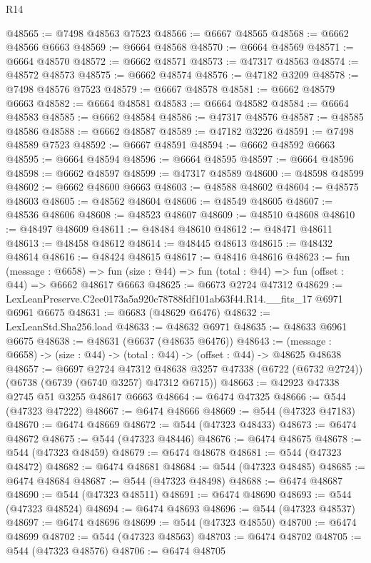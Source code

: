 \begin{lexlean}{R14}
\begin{coremodule}
@48565 := @7498 @48563 @7523
@48566 := @6667 @48565
@48568 := @6662 @48566 @6663
@48569 := @6664 @48568
@48570 := @6664 @48569
@48571 := @6664 @48570
@48572 := @6662 @48571
@48573 := @47317 @48563
@48574 := @48572 @48573
@48575 := @6662 @48574
@48576 := @47182 @3209
@48578 := @7498 @48576 @7523
@48579 := @6667 @48578
@48581 := @6662 @48579 @6663
@48582 := @6664 @48581
@48583 := @6664 @48582
@48584 := @6664 @48583
@48585 := @6662 @48584
@48586 := @47317 @48576
@48587 := @48585 @48586
@48588 := @6662 @48587
@48589 := @47182 @3226
@48591 := @7498 @48589 @7523
@48592 := @6667 @48591
@48594 := @6662 @48592 @6663
@48595 := @6664 @48594
@48596 := @6664 @48595
@48597 := @6664 @48596
@48598 := @6662 @48597
@48599 := @47317 @48589
@48600 := @48598 @48599
@48602 := @6662 @48600 @6663
@48603 := @48588 @48602
@48604 := @48575 @48603
@48605 := @48562 @48604
@48606 := @48549 @48605
@48607 := @48536 @48606
@48608 := @48523 @48607
@48609 := @48510 @48608
@48610 := @48497 @48609
@48611 := @48484 @48610
@48612 := @48471 @48611
@48613 := @48458 @48612
@48614 := @48445 @48613
@48615 := @48432 @48614
@48616 := @48424 @48615
@48617 := @48416 @48616
@48623 := fun (message : @6658) =>
  fun (size : @44) => fun (total : @44) => fun (offset : @44) => @6662 @48617 @6663
@48625 := @6673 @2724 @47312
@48629 := LexLeanPreserve.C2ee0173a5a920c78788fdf101ab63f44.R14.__fits_17 @6971 @6961 @6675
@48631 := @6683 (@48629 @6476)
@48632 := LexLeanStd.Sha256.load
@48633 := @48632 @6971
@48635 := @48633 @6961 @6675
@48638 := @48631 (@6637 (@48635 @6476))
@48643 := (message : @6658) -> (size : @44) -> (total : @44) -> (offset : @44) -> @48625 @48638
@48657 := @6697
    @2724
    @47312
    @48638
    @3257
    @47338
    (@6722 (@6732 @2724))
    (@6738 (@6739 (@6740 @3257) @47312 @6715))
@48663 := @42923 @47338 @2745 @51 @3255 @48617 @6663
@48664 := @6474 @47325
@48666 := @544 (@47323 @47222)
@48667 := @6474 @48666
@48669 := @544 (@47323 @47183)
@48670 := @6474 @48669
@48672 := @544 (@47323 @48433)
@48673 := @6474 @48672
@48675 := @544 (@47323 @48446)
@48676 := @6474 @48675
@48678 := @544 (@47323 @48459)
@48679 := @6474 @48678
@48681 := @544 (@47323 @48472)
@48682 := @6474 @48681
@48684 := @544 (@47323 @48485)
@48685 := @6474 @48684
@48687 := @544 (@47323 @48498)
@48688 := @6474 @48687
@48690 := @544 (@47323 @48511)
@48691 := @6474 @48690
@48693 := @544 (@47323 @48524)
@48694 := @6474 @48693
@48696 := @544 (@47323 @48537)
@48697 := @6474 @48696
@48699 := @544 (@47323 @48550)
@48700 := @6474 @48699
@48702 := @544 (@47323 @48563)
@48703 := @6474 @48702
@48705 := @544 (@47323 @48576)
@48706 := @6474 @48705

\end{coremodule}
\end{lexlean}
